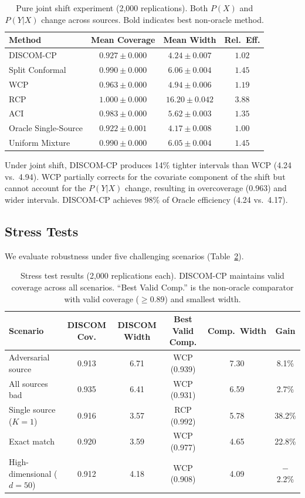 \documentclass{article}
\newcommand{\DISCOM}{\textsc{DISCOM-CP}}
\begin{document}
\begin{table}[t]
\caption{Pure joint shift experiment (2,000 replications). Both $P(X)$ and $P(Y|X)$ change across sources. Bold indicates best non-oracle method.}
\label{tab:joint_shift}
\centering
\small
\begin{tabular}{lccc}
\toprule
\textbf{Method} & \textbf{Mean Coverage} & \textbf{Mean Width} & \textbf{Rel.\ Eff.} \\
\midrule
\DISCOM{} & $\mathbf{0.927 \pm 0.000}$ & $\mathbf{4.24 \pm 0.007}$ & $\mathbf{1.02}$ \\
Split Conformal & $0.990 \pm 0.000$ & $6.06 \pm 0.004$ & $1.45$ \\
WCP & $0.963 \pm 0.000$ & $4.94 \pm 0.006$ & $1.19$ \\
RCP & $1.000 \pm 0.000$ & $16.20 \pm 0.042$ & $3.88$ \\
ACI & $0.983 \pm 0.000$ & $5.62 \pm 0.003$ & $1.35$ \\
Oracle Single-Source & $0.922 \pm 0.001$ & $4.17 \pm 0.008$ & $1.00$ \\
Uniform Mixture & $0.990 \pm 0.000$ & $6.05 \pm 0.004$ & $1.45$ \\
\bottomrule
\end{tabular}
\end{table}

Under joint shift, \DISCOM{} produces 14\% tighter intervals than WCP (4.24 vs.\ 4.94). WCP partially corrects for the covariate component of the shift but cannot account for the $P(Y|X)$ change, resulting in overcoverage (0.963) and wider intervals. \DISCOM{} achieves 98\% of Oracle efficiency (4.24 vs.\ 4.17).

\subsection{Stress Tests}
\label{sec:stress}

We evaluate robustness under five challenging scenarios (Table~\ref{tab:stress}).

\begin{table}[t]
\caption{Stress test results (2,000 replications each). \DISCOM{} maintains valid coverage across all scenarios. ``Best Valid Comp.'' is the non-oracle comparator with valid coverage ($\geq 0.89$) and smallest width.}
\label{tab:stress}
\centering
\small
\begin{tabular}{lccccc}
\toprule
\textbf{Scenario} & \textbf{DISCOM Cov.} & \textbf{DISCOM Width} & \textbf{Best Valid Comp.} & \textbf{Comp.\ Width} & \textbf{Gain} \\
\midrule
Adversarial source & 0.913 & 6.71 & WCP (0.939) & 7.30 & 8.1\% \\
All sources bad & 0.935 & 6.41 & WCP (0.931) & 6.59 & 2.7\% \\
Single source ($K\!=\!1$) & 0.916 & 3.57 & RCP (0.992) & 5.78 & 38.2\% \\
Exact match & 0.920 & 3.59 & WCP (0.977) & 4.65 & 22.8\% \\
High-dimensional ($d\!=\!50$) & 0.912 & 4.18 & WCP (0.908) & 4.09 & $-$2.2\% \\
\bottomrule
\end{tabular}
\end{table}
\end{document}
